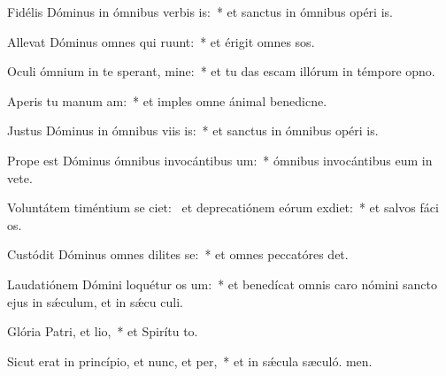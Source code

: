 \item Fidélis Dóminus in ómnibus verbis is:~* et sanctus in ómnibus opéri is.
\item Allevat Dóminus omnes qui ruunt:~* et érigit omnes sos.
\item Oculi ómnium in te sperant, mine:~* et tu das escam illórum in témpore opno.
\item Aperis tu manum am:~* et imples omne ánimal benedicne.
\item Justus Dóminus in ómnibus viis is:~* et sanctus in ómnibus opéri is.
\item Prope est Dóminus ómnibus invocántibus um:~* ómnibus invocántibus eum in vete.
\item Voluntátem timéntium se ciet:~\pscross{} et deprecatiónem eórum exdiet:~* et salvos fáci os.
\item Custódit Dóminus omnes dilites se:~* et omnes peccatóres det.
\item Laudatiónem Dómini loquétur os um:~* et benedícat omnis caro nómini sancto ejus in sǽculum, et in sǽcu culi.
\item Glória Patri, et lio,~* et Spirítu to.
\item Sicut erat in princípio, et nunc, et per,~* et in sǽcula sæculó. men.
